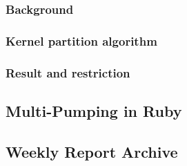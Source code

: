\documentclass[a4paper, 10pt]{report}
\begin{document}
\subsection{Background}

\subsection{Kernel partition algorithm}

\subsection{Result and restriction}

\section{Multi-Pumping in Ruby}

\begin{appendices}
\chapter{Weekly Report Archive}

 	\newpage
 	\newpage
 	\newpage
 	\newpage

\end{appendices}



\end{document}

